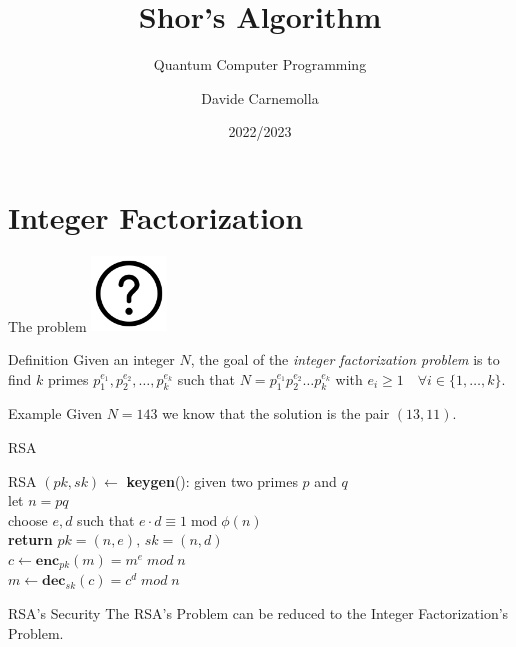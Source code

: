 \documentclass{beamer}
\title{Shor's Algorithm}
\subtitle{Quantum Computer Programming}
\author{Davide Carnemolla}
\institute{Department of Mathematics and \\ Computer Science \\ \\ University of Catania}
\date{2022/2023}
\begin{document}
    \begin{frame}
        \maketitle
    \end{frame}
    
    \section{Integer Factorization}

    \begin{frame}{The problem}
        \centering
        \includegraphics[height=2cm,keepaspectratio]{images/problem.pdf}
        \vspace{0.5cm}
        \begin{block}{Definition}
            Given an integer $N$, the goal of the \textit{integer factorization problem} is to find $k$ primes $p_1^{e_1},p_2^{e_2},\dots,p_k^{e_k}$ such that $N = p_1^{e_1}p_2^{e_2} \dots p_k^{e_k}$ with $e_i \geq 1 \quad \forall i \in \{1, \dots, k\}$.
        \end{block}
        \begin{exampleblock}{Example}
            Given $N = 143$ we know that the solution is the pair $(13, 11).$
        \end{exampleblock}
        
    \end{frame}

    \begin{frame}{RSA}
        \centering
        \begin{block}{RSA}
            $(pk,sk) \leftarrow$ \textbf{keygen}(): \hspace{0.05cm} given two primes $p$ and $q$ \\ 
                \hspace{3.7cm} let $n = pq$ \\ 
                \hspace{3.7cm} choose $e,d$ such that $e \cdot d \equiv 1 \; \text{mod} \; \phi(n)$ \\
                \hspace{3.7cm} \textbf{return} $pk = (n,e), \, sk = (n, d)$ \\
            \vspace{0.5cm}
            $c \leftarrow \textbf{enc}_{pk}(m) = m^e \; mod \; n$ \\
            \vspace{0.5cm}
            $m \leftarrow \textbf{dec}_{sk}(c) = c^d \; mod \; n$
        \end{block}
        \begin{alertblock}{RSA's Security}
            The RSA's Problem can be reduced to the Integer Factorization's Problem.
        \end{alertblock}
    \end{frame}
\end{document}

